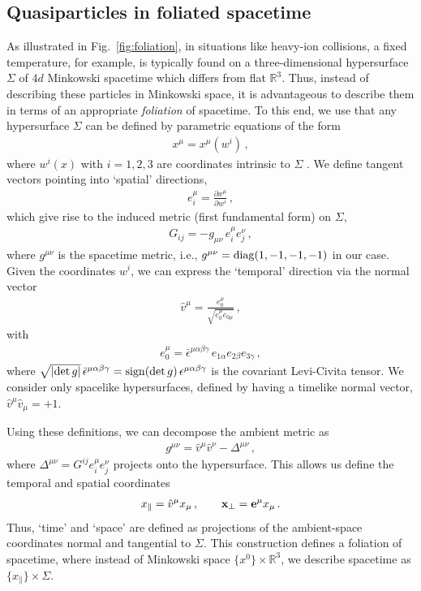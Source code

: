 \documentclass[reprint,superscriptaddress,english,preprintnumbers,amsmath,amssymb,aps,prx]{revtex4-2}
\def\det{{\mathrm{det}}}
\def\Fig#1{Fig.~\ref{#1}}
\begin{document}
\subsection{Quasiparticles in foliated spacetime}\label{sec:asy}

As illustrated in \Fig{fig:foliation}, in situations like heavy-ion collisions, a fixed temperature, for example, is typically found on a three-dimensional hypersurface $\Sigma$ of 4$d$ Minkowski spacetime which differs from flat $\mathbb{R}^3$.
Thus, instead of describing these particles in Minkowski space, it is advantageous to describe them in terms of an appropriate \emph{foliation} of spacetime. To this end, we use that any hypersurface $\Sigma$ can be defined by
parametric equations of the form
\begin{align}
x^\mu  = x^\mu(w^i)\,,
\end{align}
where $w^i(x)$ with $i=1,2,3$ are coordinates intrinsic to $\Sigma$ \cite{Poisson:2009pwt}.
We define tangent vectors pointing into `spatial' directions,
\begin{align}
e_i^\mu = \frac{\partial x^\mu}{\partial w^i}\,,
\end{align}
which give rise to the induced metric (first fundamental form) on $\Sigma$,
\begin{align}\label{eq:G}
G_{ij} = -g_{\mu\nu}\, e_i^\mu e_j^\nu\,,
\end{align}
where $g^{\mu\nu}$ is the spacetime metric, i.e., $g^{\mu\nu} = {\rm diag}(1,-1,-1,-1)$ in our case.
Given the coordinates $w^i$, we can express the `temporal' direction via the normal vector
\begin{align}
\hat v^\mu = \frac{e_0^\mu}{\sqrt{e_0^\mu e_{0\mu}}}\,,
\end{align}
with
\begin{align}
e_0^\mu = \bar\epsilon^{\mu\alpha\beta\gamma}\, e_{1\alpha} e_{2\beta} e_{3\gamma}\,,
\end{align}
where $\sqrt{|\det\, g|}\, \bar\epsilon^{\mu\alpha\beta\gamma} = {\rm sign}(\det\, g)\,\epsilon^{\mu\alpha\beta\gamma}$ is the covariant Levi-Civita tensor.
We consider only spacelike hypersurfaces, defined by having a timelike normal vector, $\hat v^\mu \hat v_\mu = +1$.

Using these definitions, we can decompose the ambient metric as
\begin{align}
g^{\mu\nu} = \hat v^\mu \hat v^\nu - \Delta^{\mu\nu}\,,
\end{align}
where $\Delta^{\mu\nu} = G^{ij} e_i^\mu e_j^\nu$ projects onto the hypersurface. This allows us define the temporal and spatial coordinates
\begin{align}\label{eq:coordconv}
x_\parallel = \hat v^\mu  x_\mu\,, \qquad 
\bold{x}_\perp = \bold{e}^\mu  x_\mu\,.
\end{align}
Thus, `time' and `space' are defined as projections of the ambient-space coordinates normal and tangential to $\Sigma$.
This construction defines a foliation of spacetime, where instead of Minkowski space $\{x^0\}\times \mathbb{R}^3$, we describe spacetime as $\{x_\parallel\}\times \Sigma$.
\end{document}
